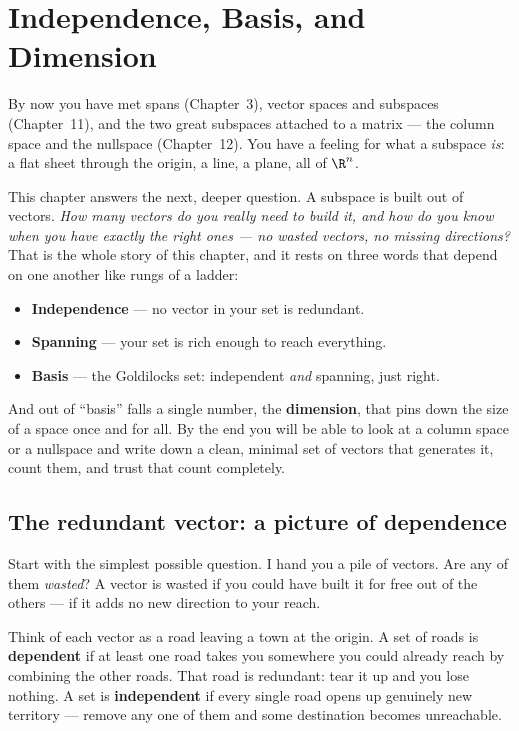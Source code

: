 \chapter{Independence, Basis, and Dimension}

By now you have met spans (Chapter~3), vector spaces and subspaces
(Chapter~11), and the two great subspaces attached to a matrix --- the column
space and the nullspace (Chapter~12). You have a feeling for what a subspace
\emph{is}: a flat sheet through the origin, a line, a plane, all of $\R^n$.

This chapter answers the next, deeper question. A subspace is built out of
vectors. \emph{How many vectors do you really need to build it, and how do you
know when you have exactly the right ones --- no wasted vectors, no missing
directions?} That is the whole story of this chapter, and it rests on three
words that depend on one another like rungs of a ladder:

\begin{itemize}
  \item \textbf{Independence} --- no vector in your set is redundant.
  \item \textbf{Spanning} --- your set is rich enough to reach everything.
  \item \textbf{Basis} --- the Goldilocks set: independent \emph{and} spanning, just right.
\end{itemize}

And out of ``basis'' falls a single number, the \textbf{dimension}, that pins
down the size of a space once and for all. By the end you will be able to look
at a column space or a nullspace and write down a clean, minimal set of vectors
that generates it, count them, and trust that count completely.

\chapterline

\section{The redundant vector: a picture of dependence}
\label{ch14:redundant}

Start with the simplest possible question. I hand you a pile of vectors. Are any
of them \emph{wasted}? A vector is wasted if you could have built it for free
out of the others --- if it adds no new direction to your reach.

\begin{intuitionbox}
Think of each vector as a road leaving a town at the origin. A set of roads is
\textbf{dependent} if at least one road takes you somewhere you could already
reach by combining the other roads. That road is redundant: tear it up and you
lose nothing. A set is \textbf{independent} if every single road opens up genuinely
new territory --- remove any one of them and some destination becomes
unreachable.
\end{intuitionbox}

